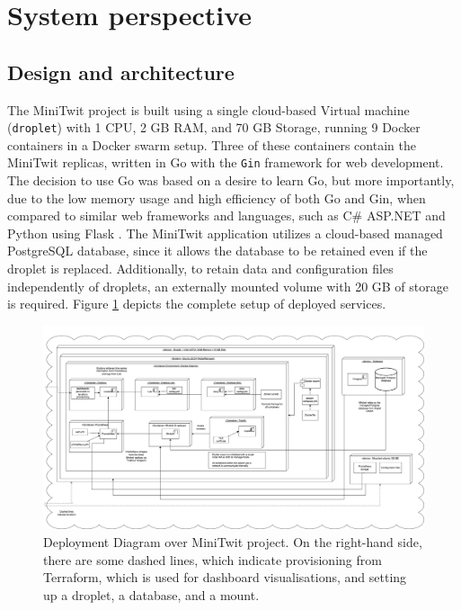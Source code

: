 \section{System perspective} \label{sp}
\subsection{Design and architecture} %
The MiniTwit project is built using a single cloud-based  Virtual machine (\texttt{droplet}) with 1 CPU, 2 GB RAM, and 70 GB Storage, running 9 Docker containers in a Docker swarm setup. Three of these containers contain the MiniTwit replicas, written in Go with the \texttt{Gin} framework for web development. The decision to use Go was based on a desire to learn Go, but more importantly, due to the low memory usage and high efficiency of both Go and Gin, when compared to similar web frameworks and languages, such as C\# ASP.NET and Python using Flask \parencite{benchmark}. The MiniTwit application utilizes a cloud-based managed PostgreSQL database, since it allows the database to be retained even if the droplet is replaced. Additionally, to retain data and configuration files independently of droplets, an externally mounted volume with 20 GB of storage is required. Figure \ref{fig:Deployment} depicts the complete setup of deployed services.

\begin{landscape}
\begin{figure}[H]
    \centering
    \includegraphics[width=1\linewidth]{images/deploydiag.png}
    \caption{Deployment Diagram over MiniTwit project. On the right-hand side, there are some dashed lines, which indicate provisioning from Terraform, which is used for dashboard visualisations, and setting up a droplet, a database, and a mount.}
    \label{fig:Deployment}
\end{figure}
\end{landscape}


